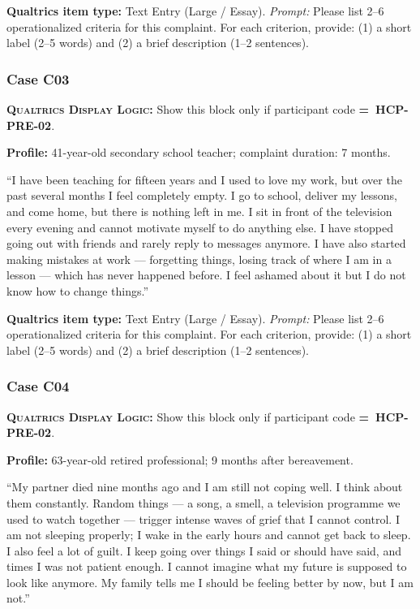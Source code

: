 \documentclass[11pt,a4paper]{article}
\newcommand{\responsetextarea}[1]{\begin{tcolorbox}[colback=ResponseBG,colframe=GoldAmber,boxrule=0.6pt,arc=1.5mm,left=6pt,right=6pt,top=5pt,bottom=5pt]\small\textbf{\color{GoldAmber}Qualtrics item type:} Text Entry (Large / Essay). \quad \textit{Prompt:} #1\end{tcolorbox}}
\newcommand{\dlnote}[1]{\par\vspace{0.15em}\noindent\begin{tcolorbox}[colback=AccentAmber,colframe=GoldAmber,boxrule=0.45pt,arc=1mm,left=5pt,right=5pt,top=2.5pt,bottom=2.5pt]\footnotesize\textbf{\color{GoldAmber}\scshape Qualtrics Display Logic:} Show this block only if participant code \textbf{=~#1}.\end{tcolorbox}\vspace{0.1em}}
\begin{document}
\responsetextarea{Please list 2--6 operationalized criteria for this complaint. For each criterion, provide: (1) a short label (2--5 words) and (2) a brief description (1--2 sentences).}

\vspace{0.4em}
\subsubsection*{Case C03}
\dlnote{HCP-PRE-02}

\begin{complaintbox}[title=Case C03 --- Complaint Vignette]
\textbf{Profile:} 41-year-old secondary school teacher; complaint duration: 7 months.

\smallskip
``I have been teaching for fifteen years and I used to love my work, but over the past several months I feel completely empty. I go to school, deliver my lessons, and come home, but there is nothing left in me. I sit in front of the television every evening and cannot motivate myself to do anything else. I have stopped going out with friends and rarely reply to messages anymore. I have also started making mistakes at work --- forgetting things, losing track of where I am in a lesson --- which has never happened before. I feel ashamed about it but I do not know how to change things.''
\end{complaintbox}

\responsetextarea{Please list 2--6 operationalized criteria for this complaint. For each criterion, provide: (1) a short label (2--5 words) and (2) a brief description (1--2 sentences).}

\vspace{0.4em}
\subsubsection*{Case C04}
\dlnote{HCP-PRE-02}

\begin{complaintbox}[title=Case C04 --- Complaint Vignette]
\textbf{Profile:} 63-year-old retired professional; 9 months after bereavement.

\smallskip
``My partner died nine months ago and I am still not coping well. I think about them constantly. Random things --- a song, a smell, a television programme we used to watch together --- trigger intense waves of grief that I cannot control. I am not sleeping properly; I wake in the early hours and cannot get back to sleep. I also feel a lot of guilt. I keep going over things I said or should have said, and times I was not patient enough. I cannot imagine what my future is supposed to look like anymore. My family tells me I should be feeling better by now, but I am not.''
\end{complaintbox}
\end{document}
